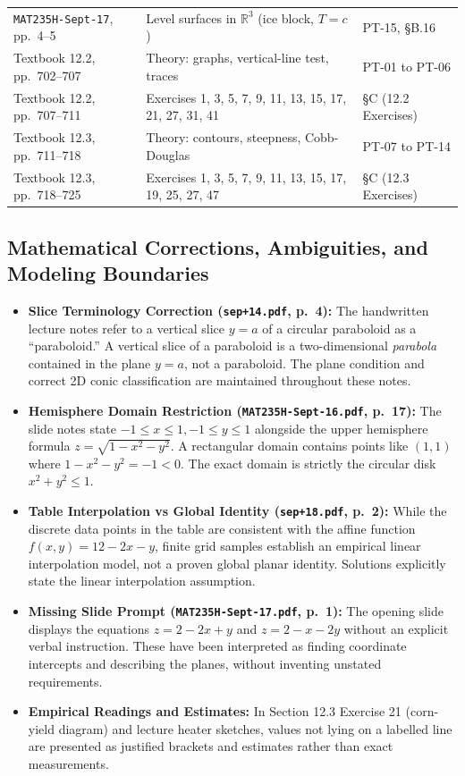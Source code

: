 \documentclass[11pt,letterpaper]{article}
\newcommand{\R}{\mathbb{R}}
\begin{document}
\begin{longtable}{p{.38\linewidth}p{.38\linewidth}p{.18\linewidth}}
\texttt{MAT235H-Sept-17}, pp.~4--5 & Level surfaces in $\R^3$ (ice block, $T=c$) & PT-15, \S B.16 \\
Textbook 12.2, pp.~702--707 & Theory: graphs, vertical-line test, traces & PT-01 to PT-06 \\
Textbook 12.2, pp.~707--711 & Exercises 1, 3, 5, 7, 9, 11, 13, 15, 17, 21, 27, 31, 41 & \S C (12.2 Exercises) \\
Textbook 12.3, pp.~711--718 & Theory: contours, steepness, Cobb-Douglas & PT-07 to PT-14 \\
Textbook 12.3, pp.~718--725 & Exercises 1, 3, 5, 7, 9, 11, 13, 15, 17, 19, 25, 27, 47 & \S C (12.3 Exercises) \\
\bottomrule
\end{longtable}
\normalsize

\subsection{Mathematical Corrections, Ambiguities, and Modeling Boundaries}
\begin{itemize}[leftmargin=*]
    \item \textbf{Slice Terminology Correction (\texttt{sep+14.pdf}, p.~4):} The handwritten lecture notes refer to a vertical slice $y = a$ of a circular paraboloid as a ``paraboloid.'' A vertical slice of a paraboloid is a two-dimensional \emph{parabola} contained in the plane $y=a$, not a paraboloid. The plane condition and correct 2D conic classification are maintained throughout these notes.
    \item \textbf{Hemisphere Domain Restriction (\texttt{MAT235H-Sept-16.pdf}, p.~17):} The slide notes state $-1 \le x \le 1, -1 \le y \le 1$ alongside the upper hemisphere formula $z = \sqrt{1-x^2-y^2}$. A rectangular domain contains points like $(1,1)$ where $1-x^2-y^2 = -1 < 0$. The exact domain is strictly the circular disk $x^2 + y^2 \le 1$.
    \item \textbf{Table Interpolation vs Global Identity (\texttt{sep+18.pdf}, p.~2):} While the discrete data points in the table are consistent with the affine function $f(x,y) = 12 - 2x - y$, finite grid samples establish an empirical linear interpolation model, not a proven global planar identity. Solutions explicitly state the linear interpolation assumption.
    \item \textbf{Missing Slide Prompt (\texttt{MAT235H-Sept-17.pdf}, p.~1):} The opening slide displays the equations $z = 2 - 2x + y$ and $z = 2 - x - 2y$ without an explicit verbal instruction. These have been interpreted as finding coordinate intercepts and describing the planes, without inventing unstated requirements.
    \item \textbf{Empirical Readings and Estimates:} In Section 12.3 Exercise 21 (corn-yield diagram) and lecture heater sketches, values not lying on a labelled line are presented as justified brackets and estimates rather than exact measurements.
\end{itemize}
\end{document}
